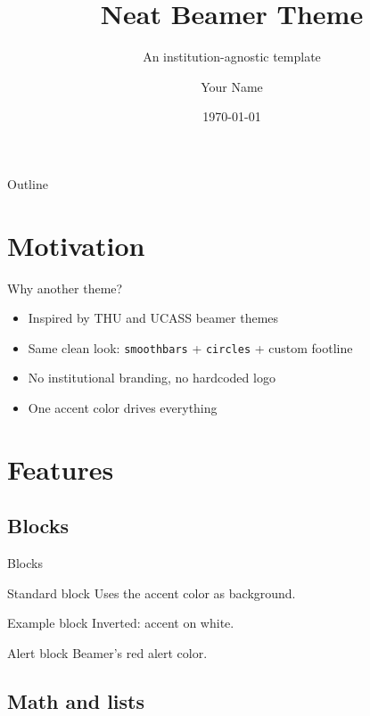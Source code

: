 \documentclass[aspectratio=43]{beamer}
\title{Neat Beamer Theme}
\subtitle{An institution-agnostic template}
\author{Your Name}
\institute{Independent}
\date{\today}
\begin{document}
\begin{frame}
  \titlepage
\end{frame}

\begin{frame}{Outline}
  \tableofcontents
\end{frame}

\section{Motivation}

\begin{frame}{Why another theme?}
  \begin{itemize}
    \item Inspired by THU and UCASS beamer themes
    \item Same clean look: \texttt{smoothbars} + \texttt{circles} + custom footline
    \item No institutional branding, no hardcoded logo
    \item One accent color drives everything
  \end{itemize}
\end{frame}

\section{Features}

\subsection{Blocks}

\begin{frame}{Blocks}
  \begin{block}{Standard block}
    Uses the accent color as background.
  \end{block}

  \begin{exampleblock}{Example block}
    Inverted: accent on white.
  \end{exampleblock}

  \begin{alertblock}{Alert block}
    Beamer's red alert color.
  \end{alertblock}
\end{frame}

\subsection{Math and lists}
\end{document}
